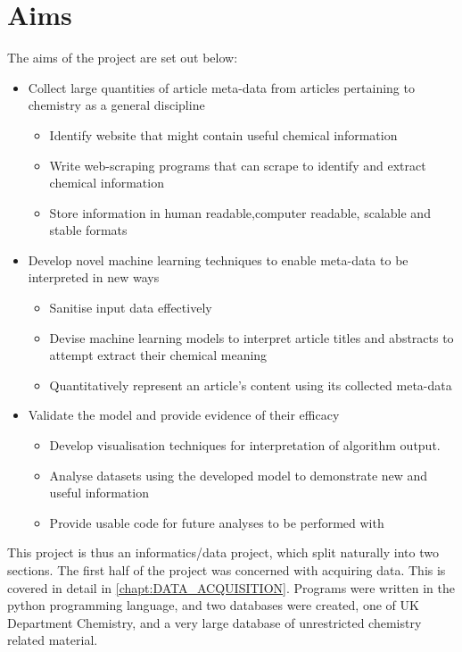 \section{Aims}
The aims of the project are set out below:
\begin{itemize}
\item Collect large quantities of article meta-data from articles pertaining to chemistry as a general discipline
\begin{itemize}
\item Identify website that might contain useful chemical information
\item Write web-scraping programs that can scrape to identify and extract chemical information
\item Store information in human readable,computer readable, scalable and stable formats
\end{itemize}
\item Develop novel machine learning techniques to enable meta-data to be interpreted in new ways
\begin{itemize}
\itemsep0em 
\item Sanitise input data effectively
\item Devise  machine learning models to interpret article titles and abstracts to attempt extract their chemical meaning
\item Quantitatively represent an article's content using its collected meta-data
\end{itemize}
\item Validate the model and provide evidence of their efficacy
\begin{itemize}
\item Develop visualisation techniques for interpretation of algorithm output.
\item Analyse datasets using the developed model to demonstrate new and useful information
\item Provide usable code for future analyses to be performed with
\end{itemize}
\end{itemize}
This project is thus an informatics/data project, which split naturally into two sections. The first half of the project was concerned with acquiring data. This is covered in detail in \ref{chapt:DATA_ACQUISITION}.
Programs were written in the python programming language, and two databases were created, one of UK Department Chemistry, and a very large database of unrestricted chemistry related material.

